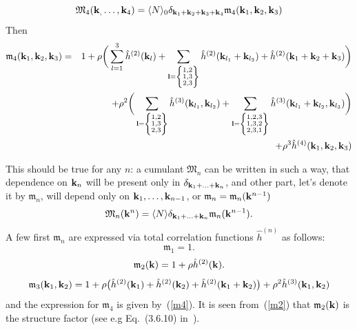 \begin{equation}
\mathfrak M_4(\vb k_, \dotsc, \vb k_4) = \langle N \rangle_0 \delta_{\vb k_1 + \vb k_2 + \vb k_3 + \vb k_4} \mathfrak m_4(\vb k_1, \vb k_2, \vb k_3) 
\end{equation}
Then
\begin{eqnarray}
	\label{m4}
	\mathfrak m_4(\vb k_1, \vb k_2, \vb k_3) &=&  1 + \rho \bigg(
	\sum_{l = 1}^3 \hat{h}^{(2)}(\vb k_l) +
	\sum_{\vb l = \left\{\substack{1,2 \\ 1,3 \\ 2,3} \right\} }  \hat{h}^{(2)} (\vb k_{l_1} + \vb k_{l_2})
	+ \hat{h}^{(2)} (\vb k_1 + \vb k_2 + \vb k_3)
	\bigg)
	\nonumber \\
	&&  + \rho^2 \bigg(
	\sum_{\vb l = \left\{\substack{1,2 \\ 1,3 \\ 2,3 }\right\} }
	\hat{h}^{(3)}(\vb k_{l_1}, \vb k_{l_2})
	+ \sum_{\vb l = \left\{\substack{1,2,3 \\ 1,3,2 \\ 2,3,1}\right\} }
	\hat{h}^{(3)}(\vb k_{l_1} + \vb k_{l_2}, \vb k_{l_3})
	\bigg)
	\nonumber\\
	&& + \rho^3 \hat{h}^{(4)} (\vb k_1, \vb k_2, \vb k_3)
\end{eqnarray}


This should be true for any $n$: a cumulant $\mathfrak M_n$ can be written in such a way, that dependence on $\vb k_n$ will be present only in $\delta_{\vb k_1 + \dotsc + \vb k_n}$, and other part, let's denote it by $\mathfrak m_n$, will depend only on $\vb k_1, \dotsc, \vb k_{n-1}$, or $\mathfrak m_n = \mathfrak m_n(\vb k^{n-1})$
\begin{equation}
	\mathfrak M_n(\vb k^n) = \langle N \rangle \delta_{\vb k_1 + \dotsc + \vb k_n} \mathfrak m_n(\vb k^{n-1}).
\end{equation}
A few first $\mathfrak m_n$ are expressed via total correlation functions $\hat{h}^{(n)}$ as follows:
\begin{equation}
	\mathfrak m_1 = 1.
\end{equation}
\begin{equation}
	\label{m2}
	\mathfrak m_2(\vb k) = 1 + \rho \hat{h}^{(2)}(\vb k).
\end{equation}
\begin{equation}
	\label{m3}
	\mathfrak m_3(\vb k_1, \vb k_2) = 1 +  \rho \big(\hat{h}^{(2)}(\vb k_1) + \hat{h}^{(2)}(\vb k_2) + \hat{h}^{(2)}(\vb k_1 + \vb k_2) \big) 
	+ \rho^2 \hat{h}^{(3)}(\vb k_1, \vb k_2)
\end{equation}
and the expression for $\mathfrak m_4$ is given by~(\ref{m4}).
It is seen from~(\ref{m2}) that $\mathfrak m_2(\vb k)$ is the structure factor (see e.g Eq.~(3.6.10) in~\cite{HANSEN2013ch3}).

